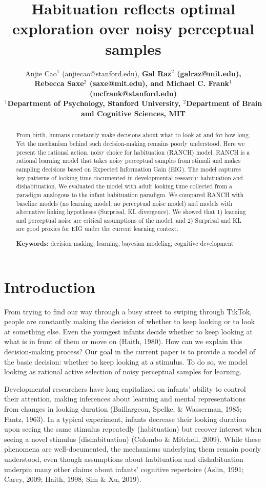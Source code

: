 \documentclass[10pt, letterpaper]{article}
\title{Habituation reflects optimal exploration over noisy perceptual
samples}
\author{Anjie Cao$^1$  (anjiecao@stanford.edu), \bf{Gal Raz$^2$ (galraz@mit.edu)},\\ \bf{Rebecca Saxe$^2$ (saxe@mit.edu)},
 and \bf{Michael C. Frank$^1$ (mcfrank@stanford.edu)} \\
$^1$Department of Psychology, Stanford University, $^2$Department of Brain and Cognitive Sciences, MIT \\ }
\begin{document}
\maketitle

\begin{abstract}
From birth, humans constantly make decisions about what to look at and
for how long. Yet the mechanism behind such decision-making remains
poorly understood. Here we present the rational action, noisy choice for
habituation (RANCH) model. RANCH is a rational learning model that takes
noisy perceptual samples from stimuli and makes sampling decisions based
on Expected Information Gain (EIG). The model captures key patterns of
looking time documented in developmental research: habituation and
dishabituation. We evaluated the model with adult looking time collected
from a paradigm analogous to the infant habituation paradigm. We
compared RANCH with baseline models (no learning model, no perceptual
noise model) and models with alternative linking hypotheses (Surprisal,
KL divergence). We showed that 1) learning and perceptual noise are
critical assumptions of the model, and 2) Surprisal and KL are good
proxies for EIG under the current learning context.

\textbf{Keywords:}
decision making; learning; bayesian modeling; cognitive development
\end{abstract}

\hypertarget{introduction}{%
\section{Introduction}\label{introduction}}

From trying to find our way through a busy street to swiping through
TikTok, people are constantly making the decision of whether to keep
looking or to look at something else. Even the youngest infants decide
whether to keep looking at what is in front of them or move on (Haith,
1980). How can we explain this decision-making process? Our goal in the
current paper is to provide a model of the basic decision: whether to
keep looking at a stimulus. To do so, we model looking as rational
active selection of noisy perceptual samples for learning.

Developmental researchers have long capitalized on infants' ability to
control their attention, making inferences about learning and mental
representations from changes in looking duration (Baillargeon, Spelke,
\& Wasserman, 1985; Fantz, 1963). In a typical experiment, infants
decrease their looking duration upon seeing the same stimulus repeatedly
(habituation) but recover interest when seeing a novel stimulus
(dishabituation) (Colombo \& Mitchell, 2009). While these phenomena are
well-documented, the mechanisms underlying them remain poorly
understood, even though assumptions about habituation and dishabituation
underpin many other claims about infants' cognitive repertoire (Aslin,
1991; Carey, 2009; Haith, 1998; Sim \& Xu, 2019).
\end{document}
